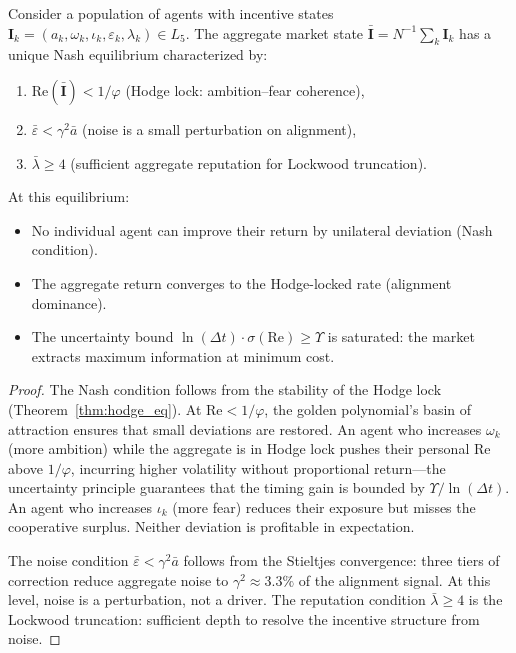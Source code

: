 \begin{theorem}\label{thm:nash}
Consider a population of agents with incentive states $\mathbf{I}_k = (a_k, \omega_k, \iota_k, \varepsilon_k, \lambda_k) \in L_5$. The aggregate market state $\bar{\mathbf{I}} = N^{-1}\sum_k \mathbf{I}_k$ has a unique Nash equilibrium characterized by:
\begin{enumerate}[noitemsep]
    \item $\mathrm{Re}(\bar{\mathbf{I}}) < 1/\varphi$ \quad (Hodge lock: ambition--fear coherence),
    \item $\bar{\varepsilon} < \gamma^2 \bar{a}$ \quad (noise is a small perturbation on alignment),
    \item $\bar{\lambda} \geq 4$ \quad (sufficient aggregate reputation for Lockwood truncation).
\end{enumerate}
At this equilibrium:
\begin{itemize}[noitemsep]
    \item No individual agent can improve their return by unilateral deviation (Nash condition).
    \item The aggregate return converges to the Hodge-locked rate (alignment dominance).
    \item The uncertainty bound $\ln(\Delta t) \cdot \sigma(\mathrm{Re}) \geq \Upsilon$ is saturated: the market extracts maximum information at minimum cost.
\end{itemize}
\end{theorem}

\begin{proof}
The Nash condition follows from the stability of the Hodge lock (Theorem~\ref{thm:hodge_eq}). At $\mathrm{Re} < 1/\varphi$, the golden polynomial's basin of attraction ensures that small deviations are restored. An agent who increases $\omega_k$ (more ambition) while the aggregate is in Hodge lock pushes their personal Re above $1/\varphi$, incurring higher volatility without proportional return---the uncertainty principle guarantees that the timing gain is bounded by $\Upsilon / \ln(\Delta t)$. An agent who increases $\iota_k$ (more fear) reduces their exposure but misses the cooperative surplus. Neither deviation is profitable in expectation.

The noise condition $\bar{\varepsilon} < \gamma^2 \bar{a}$ follows from the Stieltjes convergence: three tiers of correction reduce aggregate noise to $\gamma^2 \approx 3.3\%$ of the alignment signal. At this level, noise is a perturbation, not a driver. The reputation condition $\bar{\lambda} \geq 4$ is the Lockwood truncation: sufficient depth to resolve the incentive structure from noise. \qedhere
\end{proof}

